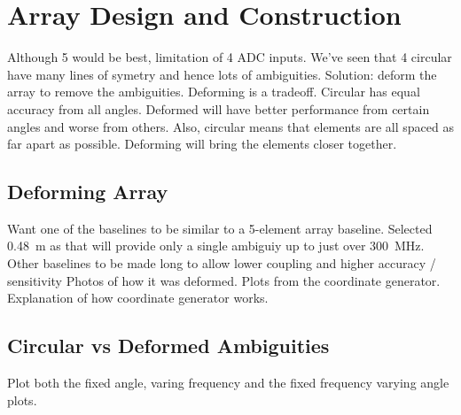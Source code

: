 \chapter{Array Design and Construction}
\graphicspath{{./img/array-construction/}}

Although 5 would be best, limitation of 4 ADC inputs.
We've seen that 4 circular have many lines of symetry and hence lots of ambiguities.
Solution: deform the array to remove the ambiguities.
Deforming is a tradeoff.
Circular has equal accuracy from all angles. Deformed will have better performance from certain angles and worse from others.
Also, circular means that elements are all spaced as far apart as possible. Deforming will bring the elements closer together.

\section{Deforming Array}
Want one of the baselines to be similar to a 5-element array baseline. Selected \SI{0.48}{\meter} as that will provide only a single ambiguiy up to just over \SI{300}{\mega\hertz}.
Other baselines to be made long to allow lower coupling and higher accuracy / sensitivity
Photos of how it was deformed.
Plots from the coordinate generator. Explanation of how coordinate generator works.

\section{Circular vs Deformed Ambiguities}
Plot both the fixed angle, varing frequency and the fixed frequency varying angle plots.

